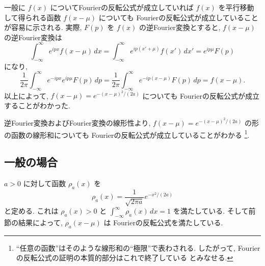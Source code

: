 \documentclass[12pt,twoside]{jarticle}
\theoremstyle{jplain}
\theoremstyle{jplain}
\theoremstyle{jplain}
\numberwithin{theorem}{section}
\numberwithin{equation}{section}
\numberwithin{figure}{section}
\numberwithin{table}{section}
\begin{document}
一般に $f(x)$ についてFourierの反転公式が成立していれば 
$f(x)$ を平行移動して得られる函数 $f(x-\mu)$ についても
Fourierの反転公式が成立していることが容易に示される.
実際, $F(p)$ を $f(x)$ の逆Fourier変換とすると,
$f(x-\mu)$ の逆Fourier変換は
\[
\int_{-\infty}^\infty e^{ipx} f(x-\mu)\,dx
=\int_{-\infty}^\infty e^{ip(x'+\mu)} f(x')\,dx'
=e^{ip\mu}F(p)
\] 
になり, 
\[
\frac{1}{2\pi}\int_{-\infty}^\infty e^{-ipx}e^{ip\mu}F(p)\,dp
=\frac{1}{2\pi}\int_{-\infty}^\infty e^{-ip(x-\mu)}F(p)\,dp
=f(x-\mu).
\]
以上によって, $f(x-\mu)=e^{-(x-\mu)^2/(2a)}$ についても
Fourierの反転公式が成立することがわかった.

逆Fourier変換およびFourier変換の線形性より, 
$f(x-\mu)=e^{-(x-\mu)^2/(2a)}$ の形の函数の線形和についても
Fourierの反転公式が成立していることがわかる%
\footnote{``任意の函数''はそのような線形和の``極限''で表わされる.
したがって, Fourierの反転公式の証明の本質的部分はこれで終了している
とみなせる.}.


\subsection{一般の場合}
\label{sec:generalcase}

$a>0$ に対して函数 $\rho_a(x)$ を
\[
\rho_a(x) = \frac{1}{\sqrt{2\pi a}}e^{-x^2/(2a)}
\]
と定める. これは $\rho_a(x)>0$ と $\int_{-\infty}^\infty \rho_a(x)\,dx=1$ 
を満たしている. そして前節の結果によって, $\rho_a(x-\mu)$ は
Fourierの反転公式を満たしている.
\end{document}
